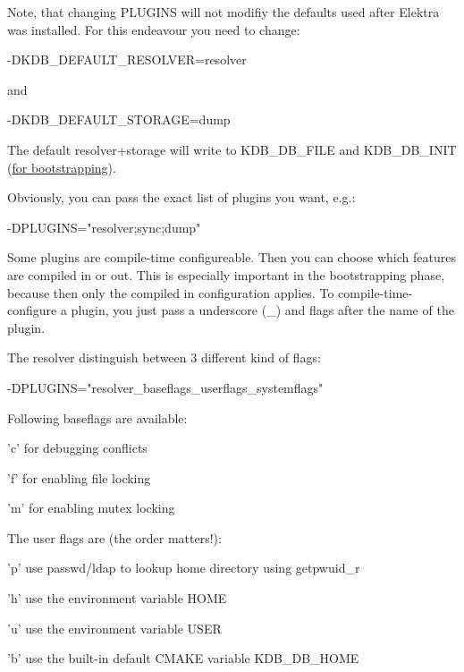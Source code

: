 Note, that changing {\ttfamily P\+L\+U\+G\+I\+N\+S} will not modifiy the defaults used after Elektra was installed. For this endeavour you need to change\+: \begin{DoxyVerb}    -DKDB_DEFAULT_RESOLVER=resolver
\end{DoxyVerb}


and \begin{DoxyVerb}    -DKDB_DEFAULT_STORAGE=dump
\end{DoxyVerb}


The default resolver+storage will write to {\ttfamily K\+D\+B\+\_\+\+D\+B\+\_\+\+F\+I\+L\+E} and {\ttfamily K\+D\+B\+\_\+\+D\+B\+\_\+\+I\+N\+I\+T} (\hyperlink{md_doc_help_elektra-bootstrapping_doc_help_elektra-bootstrapping_md}{for bootstrapping}).

Obviously, you can pass the exact list of plugins you want, e.\+g.\+: \begin{DoxyVerb}    -DPLUGINS="resolver;sync;dump"
\end{DoxyVerb}


Some plugins are compile-\/time configureable. Then you can choose which features are compiled in or out. This is especially important in the bootstrapping phase, because then only the compiled in configuration applies. To compile-\/time-\/configure a plugin, you just pass a underscore (\+\_\+) and flags after the name of the plugin.

The resolver distinguish between 3 different kind of flags\+: \begin{DoxyVerb}    -DPLUGINS="resolver_baseflags_userflags_systemflags"
\end{DoxyVerb}


Following baseflags are available\+:


\begin{DoxyItemize}
\item 'c' for debugging conflicts
\item 'f' for enabling file locking
\item 'm' for enabling mutex locking
\end{DoxyItemize}

The user flags are (the order matters!)\+:


\begin{DoxyItemize}
\item 'p' use passwd/ldap to lookup home directory using getpwuid\+\_\+r
\item 'h' use the environment variable H\+O\+M\+E
\item 'u' use the environment variable U\+S\+E\+R
\item 'b' use the built-\/in default C\+M\+A\+K\+E variable K\+D\+B\+\_\+\+D\+B\+\_\+\+H\+O\+M\+E
\end{DoxyItemize}

